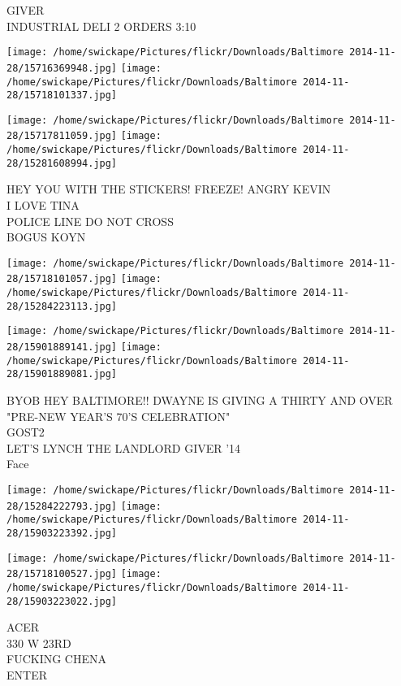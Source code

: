 \documentclass[10pt,letterpaper]{article}
\begin{document}
GIVER\\
INDUSTRIAL DELI 2 ORDERS 3:10\\
\pagebreak

\texttt{[image: /home/swickape/Pictures/flickr/Downloads/Baltimore 2014-11-28/15716369948.jpg]}
\texttt{[image: /home/swickape/Pictures/flickr/Downloads/Baltimore 2014-11-28/15718101337.jpg]}

\texttt{[image: /home/swickape/Pictures/flickr/Downloads/Baltimore 2014-11-28/15717811059.jpg]}
\texttt{[image: /home/swickape/Pictures/flickr/Downloads/Baltimore 2014-11-28/15281608994.jpg]}

HEY YOU WITH THE STICKERS!  FREEZE!  ANGRY KEVIN\\
I LOVE TINA\\
POLICE LINE DO NOT CROSS\\
BOGUS KOYN\\
\pagebreak

\texttt{[image: /home/swickape/Pictures/flickr/Downloads/Baltimore 2014-11-28/15718101057.jpg]}
\texttt{[image: /home/swickape/Pictures/flickr/Downloads/Baltimore 2014-11-28/15284223113.jpg]}

\texttt{[image: /home/swickape/Pictures/flickr/Downloads/Baltimore 2014-11-28/15901889141.jpg]}
\texttt{[image: /home/swickape/Pictures/flickr/Downloads/Baltimore 2014-11-28/15901889081.jpg]}

BYOB HEY BALTIMORE!! DWAYNE IS GIVING A THIRTY AND OVER "PRE{-}NEW YEAR'S 70'S CELEBRATION"\\
GOST2\\
LET'S LYNCH THE LANDLORD GIVER '14\\
Face\\
\pagebreak

\texttt{[image: /home/swickape/Pictures/flickr/Downloads/Baltimore 2014-11-28/15284222793.jpg]}
\texttt{[image: /home/swickape/Pictures/flickr/Downloads/Baltimore 2014-11-28/15903223392.jpg]}

\texttt{[image: /home/swickape/Pictures/flickr/Downloads/Baltimore 2014-11-28/15718100527.jpg]}
\texttt{[image: /home/swickape/Pictures/flickr/Downloads/Baltimore 2014-11-28/15903223022.jpg]}

ACER\\
330 W 23RD\\
FUCKING CHENA\\
ENTER\\
\pagebreak
\end{document}
